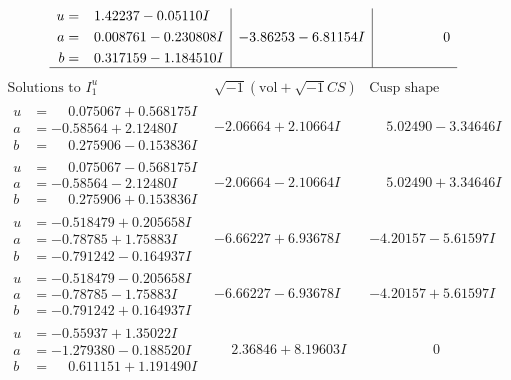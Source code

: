 \documentclass[1p]{elsarticle_modified}
\theoremstyle{definition}
\newcommand{\I}{\sqrt{-1}}
\begin{document}
$$\begin{array}{c|c|c}
\begin{aligned}
u &= \phantom{-}1.42237 - 0.05110 I \\
a &= \phantom{-}0.008761 - 0.230808 I \\
b &= \phantom{-}0.317159 - 1.184510 I\end{aligned}
 & -3.86253 - 6.81154 I & \phantom{-0.000000 } 0\\
 \hline 
 \end{array}$$\newpage$$\begin{array}{c|c|c}  
\text{Solutions to }I^u_{1}& \I (\text{vol} + \sqrt{-1}CS) & \text{Cusp shape}\\
 \hline 
\begin{aligned}
u &= \phantom{-}0.075067 + 0.568175 I \\
a &= -0.58564 + 2.12480 I \\
b &= \phantom{-}0.275906 - 0.153836 I\end{aligned}
 & -2.06664 + 2.10664 I & \phantom{-}5.02490 - 3.34646 I \\ \hline\begin{aligned}
u &= \phantom{-}0.075067 - 0.568175 I \\
a &= -0.58564 - 2.12480 I \\
b &= \phantom{-}0.275906 + 0.153836 I\end{aligned}
 & -2.06664 - 2.10664 I & \phantom{-}5.02490 + 3.34646 I \\ \hline\begin{aligned}
u &= -0.518479 + 0.205658 I \\
a &= -0.78785 + 1.75883 I \\
b &= -0.791242 - 0.164937 I\end{aligned}
 & -6.66227 + 6.93678 I & -4.20157 - 5.61597 I \\ \hline\begin{aligned}
u &= -0.518479 - 0.205658 I \\
a &= -0.78785 - 1.75883 I \\
b &= -0.791242 + 0.164937 I\end{aligned}
 & -6.66227 - 6.93678 I & -4.20157 + 5.61597 I \\ \hline\begin{aligned}
u &= -0.55937 + 1.35022 I \\
a &= -1.279380 - 0.188520 I \\
b &= \phantom{-}0.611151 + 1.191490 I\end{aligned}
 & \phantom{-}2.36846 + 8.19603 I & \phantom{-0.000000 } 0 \\ \hline\begin{aligned}

\end{aligned}
\end{array}$$
\end{document}
